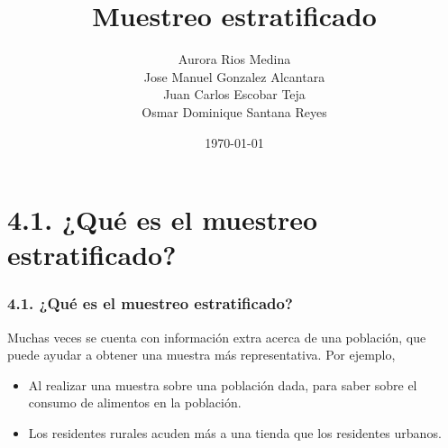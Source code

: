\documentclass[hyperref={bookmarks=false},aspectratio=169, 10pt]{beamer}
\title[Muestreo estratificado]
{\bfseries{Muestreo estratificado}}
\author[]{Aurora Rios Medina

Jose Manuel Gonzalez Alcantara

Juan Carlos Escobar Teja

Osmar Dominique Santana Reyes}
\date[Oct, 2024]{\today}
\begin{document}
\frame{\titlepage}  %



\section{4.1. ¿Qué es el muestreo estratificado?}

\begin{frame}
\frametitle{4.1. ¿Qué es el muestreo estratificado?}
    Muchas veces se cuenta con información extra acerca de una población, que puede ayudar a obtener una muestra más representativa. Por ejemplo,

    \begin{minipage}[t]{0.4\linewidth}
        \begin{itemize}
            \item Al realizar una muestra sobre una población dada, para saber sobre el consumo de alimentos en la población. 
            
        \end{itemize}
    \end{minipage} \hspace{0.05\linewidth}
    \begin{minipage}[t]{0.45\linewidth}
        \begin{itemize}
            \item Los residentes rurales acuden más a una tienda que los residentes urbanos.
            
        \end{itemize}
    \end{minipage}
\end{frame}

\end{document}
